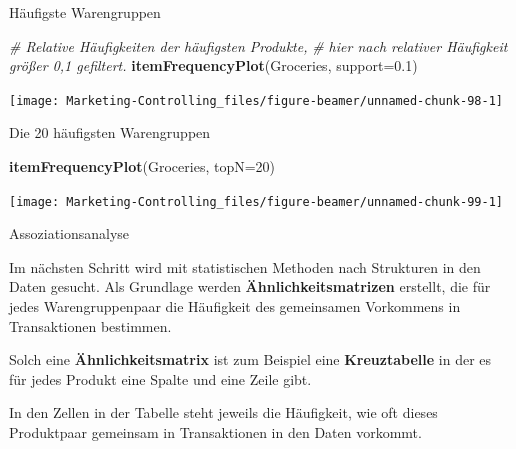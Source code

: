 \documentclass[12pt,ngerman,a4paper,ignorenonframetext,]{beamer}
\newenvironment{Shaded}{\begin{snugshade}}{\end{snugshade}}
\newcommand{\CommentTok}[1]{\textcolor[rgb]{0.56,0.35,0.01}{\textit{#1}}}
\newcommand{\DataTypeTok}[1]{\textcolor[rgb]{0.13,0.29,0.53}{#1}}
\newcommand{\DecValTok}[1]{\textcolor[rgb]{0.00,0.00,0.81}{#1}}
\newcommand{\FloatTok}[1]{\textcolor[rgb]{0.00,0.00,0.81}{#1}}
\newcommand{\KeywordTok}[1]{\textcolor[rgb]{0.13,0.29,0.53}{\textbf{#1}}}
\newcommand{\NormalTok}[1]{#1}
\begin{document}
\begin{frame}{Häufigste Warengruppen}
\protect\hypertarget{haufigste-warengruppen}{}

\begin{Shaded}
\begin{Highlighting}[]
\CommentTok{# Relative Häufigkeiten der häufigsten Produkte, }
\CommentTok{# hier nach relativer Häufigkeit größer 0,1 gefiltert.}
\KeywordTok{itemFrequencyPlot}\NormalTok{(Groceries, }\DataTypeTok{support=}\FloatTok{0.1}\NormalTok{)}
\end{Highlighting}
\end{Shaded}

\begin{center}\texttt{[image: Marketing-Controlling\_files/figure-beamer/unnamed-chunk-98-1]} \end{center}

\end{frame}

\begin{frame}{Die 20 häufigsten Warengruppen}
\protect\hypertarget{die-20-haufigsten-warengruppen}{}

\begin{Shaded}
\begin{Highlighting}[]
\KeywordTok{itemFrequencyPlot}\NormalTok{(Groceries, }\DataTypeTok{topN=}\DecValTok{20}\NormalTok{)}
\end{Highlighting}
\end{Shaded}

\begin{center}\texttt{[image: Marketing-Controlling\_files/figure-beamer/unnamed-chunk-99-1]} \end{center}

\end{frame}

\begin{frame}{Assoziationsanalyse}
\protect\hypertarget{assoziationsanalyse}{}

Im nächsten Schritt wird mit statistischen Methoden nach Strukturen in
den Daten gesucht. Als Grundlage werden \textbf{Ähnlichkeitsmatrizen}
erstellt, die für jedes Warengruppenpaar die Häufigkeit des gemeinsamen
Vorkommens in Transaktionen bestimmen.

Solch eine \textbf{Ähnlichkeitsmatrix} ist zum Beispiel eine
\textbf{Kreuztabelle} in der es für jedes Produkt eine Spalte und eine
Zeile gibt.

In den Zellen in der Tabelle steht jeweils die Häufigkeit, wie oft
dieses Produktpaar gemeinsam in Transaktionen in den Daten vorkommt.

\end{frame}
\end{document}
